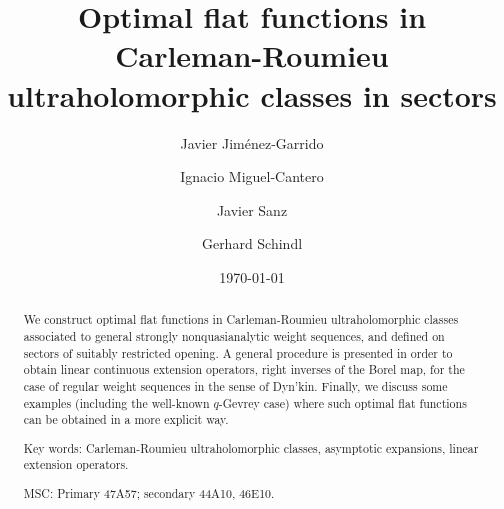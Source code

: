 \documentclass[11pt,a4paper]{article}
\theoremstyle{plain}
\theoremstyle{definition}
\begin{document}
\title{Optimal flat functions in Carleman-Roumieu ultraholomorphic classes in sectors}
\author{Javier Jim\'enez-Garrido \and Ignacio Miguel-Cantero \and Javier Sanz \and Gerhard Schindl}
\date{\today}

\maketitle

\begin{abstract}
We construct optimal flat functions in Carleman-Roumieu ultraholomorphic classes associated to general strongly nonquasianalytic weight sequences, and defined on sectors of suitably restricted opening. A general procedure is presented in order to obtain linear continuous extension operators, right inverses of the Borel map, for the case of regular weight sequences in the sense of Dyn'kin. Finally, we discuss some examples (including the well-known $q$-Gevrey case) where such optimal flat functions can be obtained in a more explicit way.
\par\medskip

\noindent Key words: Carleman-Roumieu ultraholomorphic classes, asymptotic expansions, linear extension operators.
\par
\medskip
{} MSC: Primary 47A57; secondary 44A10, 46E10. \end{abstract}
\end{document}

